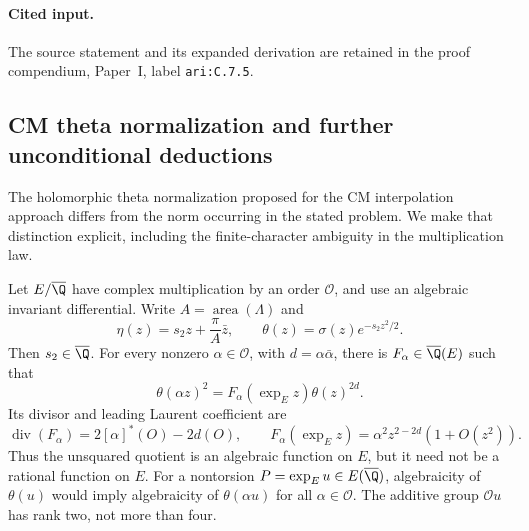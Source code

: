 \paragraph{Cited input.} \label{ari:C.7.5}The source statement and its expanded derivation are retained in the proof compendium, Paper~I, label \nolinkurl{ari:C.7.5}.\par




\subsection{CM theta normalization and further unconditional deductions}

The holomorphic theta normalization proposed for the CM interpolation approach differs from the
norm occurring in the stated problem. We make that distinction explicit,
including the finite-character ambiguity in the multiplication law.

\begin{proposition}\label{ari:C.7.6}
Let $E/\overline{\Q}$ have complex multiplication by an order
$\mathcal O$, and use an algebraic invariant differential. Write
$A=\operatorname{area}(\Lambda)$ and
\[
 \eta(z)=s_2z+\frac{\pi}{A}\bar z,\qquad
 \theta(z)=\sigma(z)e^{-s_2z^2/2}.
\]
Then $s_2\in\overline{\Q}$. For every nonzero
$\alpha\in\mathcal O$, with $d=\alpha\bar\alpha$, there is
$F_\alpha\in\overline{\Q}(E)$ such that
\begin{equation}\label{ari:eq:ct-CMmult}
 \theta(\alpha z)^2=F_\alpha(\exp_E z)\theta(z)^{2d}.
\end{equation}
Its divisor and leading Laurent coefficient are
\[
 \operatorname{div}(F_\alpha)=2[\alpha]^*(O)-2d(O),\qquad
 F_\alpha(\exp_Ez)=\alpha^2z^{2-2d}(1+O(z^2)).
\]
Thus the unsquared quotient is an algebraic function on $E$, but
it need not be a rational function on $E$. For a nontorsion
$P=\exp_Eu\in E(\overline{\Q})$, algebraicity of $\theta(u)$
would imply algebraicity of $\theta(\alpha u)$ for all
$\alpha\in\mathcal O$. The additive group $\mathcal O u$ has
rank two, not more than four.
\end{proposition}


